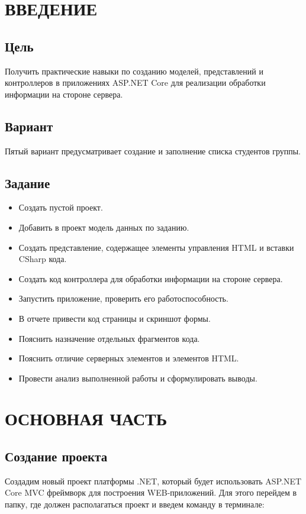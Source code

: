 \documentclass[a4paper,14pt]{extreport}
\begin{document}
	


\tableofcontents

\chapter{ВВЕДЕНИЕ}

\section{Цель}
Получить практические навыки по созданию моделей, представлений и контроллеров в приложениях ASP.NET Core для реализации обработки информации на стороне сервера.

\section{Вариант}
Пятый вариант предусматривает создание и заполнение списка студентов группы.

\section{Задание}

\begin{itemize}
	\item Создать пустой проект.
	\item Добавить в проект модель данных по заданию.
	\item Создать представление, содержащее элементы управления HTML и вставки CSharp кода.
	\item Создать код контроллера для обработки информации на стороне сервера.
	\item Запустить приложение, проверить его работоспособность.
	\item В отчете привести код страницы и скриншот формы.
	\item Пояснить назначение отдельных фрагментов кода.
	\item Пояснить отличие серверных элементов и элементов HTML.
	\item Провести анализ выполненной работы и сформулировать выводы.
\end{itemize}

\chapter{ОСНОВНАЯ ЧАСТЬ}



\section{Создание проекта}
Создадим новый проект платформы .NET, который будет использовать ASP.NET Core MVC фреймворк для построения WEB-приложений. Для этого перейдем в папку, где должен располагаться проект и введем команду в терминале:
\end{document}
